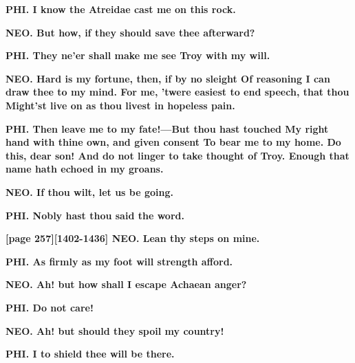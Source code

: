 \documentclass[11pt,letter]{book}
\begin{document}
\par \textbf{PHI. I know the Atreidae cast me on this rock.}
\par 

\par \textbf{NEO. But how, if they should save thee afterward?}
\par 

\par \textbf{PHI. They ne’er shall make me see Troy with my will.}
\par 

\par \textbf{NEO. Hard is my fortune, then, if by no sleight Of reasoning I can draw thee to my mind. For me, ’twere easiest to end speech, that thou Might’st live on as thou livest in hopeless pain.}
\par 

\par \textbf{PHI. Then leave me to my fate!—But thou hast touched My right hand with thine own, and given consent To bear me to my home. Do this, dear son! And do not linger to take thought of Troy. Enough that name hath echoed in my groans.}
\par 

\par \textbf{NEO. If thou wilt, let us be going.}
\par 

\par \textbf{PHI. Nobly hast thou said the word.}
\par 

\par \textbf{[page 257][1402-1436] NEO. Lean thy steps on mine.}
\par 

\par \textbf{PHI. As firmly as my foot will strength afford.}
\par 

\par \textbf{NEO. Ah! but how shall I escape Achaean anger?}
\par 

\par \textbf{PHI. Do not care!}
\par 

\par \textbf{NEO. Ah! but should they spoil my country!}
\par 

\par \textbf{PHI. I to shield thee will be there.}
\par 
\end{document}

